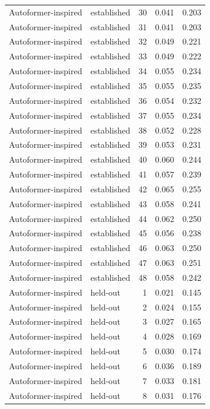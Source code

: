 \begin{tabular}{llrrr}
Autoformer-inspired & established & 30 & 0.041 & 0.203 \\
Autoformer-inspired & established & 31 & 0.041 & 0.203 \\
Autoformer-inspired & established & 32 & 0.049 & 0.221 \\
Autoformer-inspired & established & 33 & 0.049 & 0.222 \\
Autoformer-inspired & established & 34 & 0.055 & 0.234 \\
Autoformer-inspired & established & 35 & 0.055 & 0.235 \\
Autoformer-inspired & established & 36 & 0.054 & 0.232 \\
Autoformer-inspired & established & 37 & 0.055 & 0.234 \\
Autoformer-inspired & established & 38 & 0.052 & 0.228 \\
Autoformer-inspired & established & 39 & 0.053 & 0.231 \\
Autoformer-inspired & established & 40 & 0.060 & 0.244 \\
Autoformer-inspired & established & 41 & 0.057 & 0.239 \\
Autoformer-inspired & established & 42 & 0.065 & 0.255 \\
Autoformer-inspired & established & 43 & 0.058 & 0.241 \\
Autoformer-inspired & established & 44 & 0.062 & 0.250 \\
Autoformer-inspired & established & 45 & 0.056 & 0.238 \\
Autoformer-inspired & established & 46 & 0.063 & 0.250 \\
Autoformer-inspired & established & 47 & 0.063 & 0.251 \\
Autoformer-inspired & established & 48 & 0.058 & 0.242 \\
Autoformer-inspired & held-out & 1 & 0.021 & 0.145 \\
Autoformer-inspired & held-out & 2 & 0.024 & 0.155 \\
Autoformer-inspired & held-out & 3 & 0.027 & 0.165 \\
Autoformer-inspired & held-out & 4 & 0.028 & 0.169 \\
Autoformer-inspired & held-out & 5 & 0.030 & 0.174 \\
Autoformer-inspired & held-out & 6 & 0.036 & 0.189 \\
Autoformer-inspired & held-out & 7 & 0.033 & 0.181 \\
Autoformer-inspired & held-out & 8 & 0.031 & 0.176 \\

\end{tabular}
